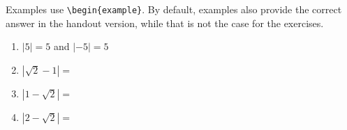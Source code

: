 \documentclass{ximera}
\begin{document}
Examples use \verb|\begin{example}|. 
By default, examples also provide the correct answer in the handout version, while that is not the case for the exercises.


\begin{example}

		\begin{enumerate}
			\item $|5|=5$ and $|-5|=5$
			\item $|\sqrt{2}-1| = $
			\item $|1-\sqrt{2}| = $
			\item $|2-\sqrt{2}| = $
		\end{enumerate}
\end{example}
\end{document}
